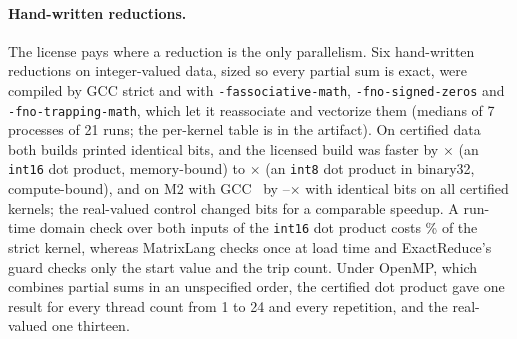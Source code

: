 \documentclass[acmsmall,review,anonymous,nonacm]{acmart}
\begin{document}
\paragraph{Hand-written reductions.} The license pays where a reduction is the
only parallelism. Six hand-written reductions on integer-valued data, sized so
every partial sum is exact, were compiled by GCC strict and with
\texttt{-fassociative-math}, \texttt{-fno-signed-zeros} and
\texttt{-fno-trapping-math}, which let it reassociate and vectorize them
(medians of 7 processes of 21 runs; the per-kernel table is in the artifact).
On certified data both builds printed identical bits, and the licensed build was faster by
\RqFourDotIOneSixSpeedup$\times$ (an \texttt{int16} dot product, memory-bound)
to \RqFourFdotIEightSpeedup$\times$ (an \texttt{int8} dot product in binary32,
compute-bound), and on M2 with GCC~\LlvmGcc{} by
\PlatBenchLo--\PlatBenchHi$\times$ with identical bits on all
\PlatBenchCertified{} certified kernels; the real-valued control changed bits
for a comparable speedup. A run-time domain check over both inputs of the
\texttt{int16} dot product costs \RqFourGuardPct\% of the strict kernel, whereas
MatrixLang checks once at load time and ExactReduce's guard checks only the
start value and the trip count. Under OpenMP, which combines partial sums in an
unspecified order, the certified dot product gave one result for every thread
count from 1 to 24 and every repetition, and the real-valued one thirteen.
\end{document}
